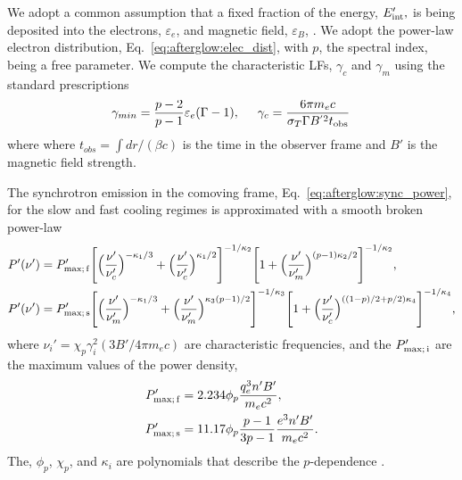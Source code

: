 We adopt a common assumption that a fixed fraction of the \blast{} 
energy, $E'_{\rm int},$ is being deposited into the electrons, 
$\varepsilon_e$, and magnetic field, $\varepsilon_B$, \citep[\eg][]{Dermer:1997pv}. 
%
We adopt the power-law electron distribution, Eq.~\eqref{eq:afterglow:elec_dist}, 
with $p$, the spectral index, being a free parameter.
%
We compute the characteristic \acp{LF}, $\gamma_c$ and $\gamma_m$ using the standard
prescriptions \citep[\eg][]{Dermer:2008ev}
%
\begin{equation}
\label{eq:afterglow:gmin_gc}
\gamma_{min} = \frac{p - 2}{p - 1}  \varepsilon_e (\Gamma - 1) , \hspace{5mm} \gamma_c = \frac{6 \pi m_e c }{\sigma_T \Gamma B^{'2} t_{\rm obs}}\, 
\end{equation}
%
where where $t_{obs} = \int dr / (\beta c)$ is the time in the 
observer frame and $B'$ is the magnetic field strength.

%
The synchrotron emission in the comoving frame, 
Eq.~\eqref{eq:afterglow:sync_power}, for the slow and fast cooling 
regimes is approximated with a smooth broken power-law 
\citep{Johannesson:2006zs}
%
\begin{equation}
\begin{aligned}
P'(\nu') &= P_{\rm max;\, f}' \Bigg[\Big(\frac{\nu'}{\nu_c'}\Big)^{-\kappa_1/3} + \Big(\frac{\nu'}{\nu_c '}\Big)^{\kappa_1/2}\Bigg]^{-1/\kappa_2} \Bigg[1 + \Big(\frac{\nu'}{\nu_m '}\Big)^{(p-1)\kappa_2/2}\Bigg]^{-1/\kappa_2}, \\
P'(\nu') &= P_{\rm max;\, s}' \Bigg[\Big(\frac{\nu'}{\nu_m'}\Big)^{-\kappa_1/3} + \Big(\frac{\nu'}{\nu_m '}\Big)^{\kappa_3(p-1)/2}\Bigg]^{-1/\kappa_3} \Bigg[1 + \Big(\frac{\nu'}{\nu_c '}\Big)^{((1-p)/2 + p/2)\kappa_4}\Bigg]^{-1/\kappa_4},
\end{aligned}
\end{equation}
%
where $\nu_i ' = \chi_p \gamma_i^2 (3 B' / 4 \pi m_e c)$ 
are characteristic frequencies, and the 
$P_{\rm max;\, i}'$ are the maximum values of the power density, 
%
\begin{align}
P' _{\rm max;\, f} &= 2.234 \phi_p \frac{q_e^3 n' B'}{m_e c^2}, \\
P' _{\rm max;\, s} &= 11.17 \phi_p \frac{p-1}{3p-1}\frac{e^3 n' B'}{m_e c^2}.
\end{align}
%
The, $\phi_p$, $\chi_p$, and $\kappa_i$ are polynomials that 
describe the $p$-dependence \citep{Johannesson:2006zs}.

%
%

